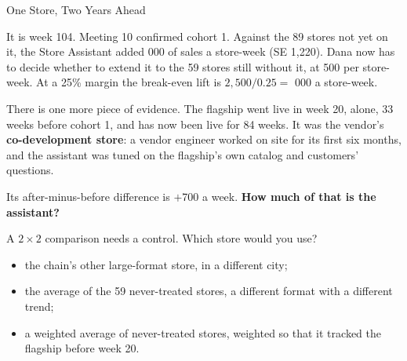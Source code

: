 \documentclass[aspectratio=169, 11pt, handout]{beamer}
\begin{document}
\begin{frame}{One Store, Two Years Ahead}

It is week 104. Meeting 10 confirmed cohort 1. Against the 89 stores not yet on it, the Store Assistant added 000 of sales a store-week (SE 1{,}220). Dana now has to decide whether to extend it to the 59 stores still without it, at 500 per store-week. At a 25\% margin the break-even lift is $2{,}500/0.25 =$ 000 a store-week.

\medskip

There is one more piece of evidence. The flagship went live in week 20, alone, 33 weeks before cohort 1, and has now been live for 84 weeks. It was the vendor's \textbf{co-development store}: a vendor engineer worked on site for its first six months, and the assistant was tuned on the flagship's own catalog and customers' questions.

\medskip

Its after-minus-before difference is $+$700 a week. \textbf{How much of that is the assistant?}

\medskip

A $2 \times 2$ comparison needs a control. Which store would you use?
\begin{itemize}
  \item the chain's other large-format store, in a different city;
  \item the average of the 59 never-treated stores, a different format with a different trend;
  \item a weighted average of never-treated stores, weighted so that it tracked the flagship before week 20.
\end{itemize}
\end{frame}
\end{document}
